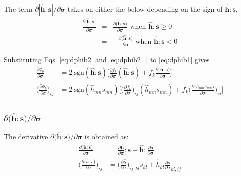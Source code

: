 \documentclass[12pt]{amsart}
\begin{document}
The term $\partial|\hat{\mathbf{h}}:\mathbf{s}|/\partial\mathbf{\sigma}$ takes on either the below depending on the sign of $\hat{\mathbf{h}}:\mathbf{s}$.
\begin{eqnarray}
  \label{eq:dphib2}
  \frac{\partial |\hat{\mathbf{h}}:\mathbf{s}| }{\partial \mathbf{\sigma}} &=&  \frac{\partial \big(\hat{\mathbf{h}}:\mathbf{s}\big)}{\partial\mathbf{\sigma}}   \text{  when } \hat{\mathbf{h}}:\mathbf{s}\ge0\\
  \label{eq:dphib2_}
&=&- \frac{\partial \big(\hat{\mathbf{h}}:\mathbf{s}\big)}{\partial\mathbf{\sigma}}   \text{  when } \hat{\mathbf{h}}:\mathbf{s} < 0
\end{eqnarray}

Substituting Eqs. \ref{eq:dphib2} and \ref{eq:dphib2_} to \ref{eq:dphib1} gives
\begin{equation}
  \label{eq:dphib1_}
  \begin{split}
    \frac{\partial\phi_b}{\partial\mathbf{\sigma}}          &= 2\ \text{sgn}(\hat{\mathbf{h}}:\mathbf{s}) \bigg[  \frac{\partial{f_k}}{\partial{\mathbf{\sigma}}} (\hat{\mathbf{h}}:\mathbf{s}) + f_k \frac{\partial\big({\hat{\mathbf{h}}:\mathbf{s}}\big)}{\partial{\mathbf{\sigma}}} \bigg]\\
    \bigg(\frac{\partial\phi_b}{\partial \sigma}\bigg)_{ij} &= 2\ \text{sgn}(\hat{h}_{mn}s_{mn}) \bigg[  \bigg(\frac{\partial f_k}{\partial \sigma}\bigg)_{ij} (\hat{h}_{mn}s_{mn}) + f_k \bigg(\frac{\partial\big({\hat{h}_{mn}s_{mn}}\big)}{\partial \sigma}\bigg)_{ij} \bigg]\\
  \end{split}
\end{equation}


\subsubsection{$\partial\big(\hat{\mathbf{h}}:\mathbf{s}\big)/ \partial\mathbf{\sigma}$ }
\label{sec:3.2.1}


The derivative  $\partial\big(\hat{\mathbf{h}}:\mathbf{s}\big)/ \partial\mathbf{\sigma}$ is obtained as:
\begin{equation}
  \begin{split}
    \label{eq:dphib3}
    \frac{\partial \big(\hat{\mathbf{h}}:\mathbf{s} \big)  } {\partial\mathbf{\sigma}} &= \frac{\partial \hat{\mathbf{h}}}{\partial\mathbf{\sigma}} : \mathbf{s} +\hat{\mathbf{h}}:\frac{\partial \mathbf{s}}{\partial\mathbf{\sigma}}\\
    \bigg(\frac{\partial \big(\hat{h}:s \big)  } {\partial \sigma}\bigg)_{ij} &= \bigg(\frac{\partial\hat{h}}{\partial \sigma}\bigg)_{ij,kl} s_{kl} +\hat{h}_{kl}\frac{\partial s}{\partial\sigma}_{kl,ij}
  \end{split}
\end{equation}
\end{document}
